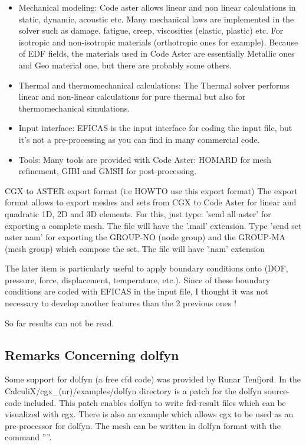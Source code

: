 \documentclass{article}
\begin{document}
\begin{appendix}
\begin{itemize}

\item Mechanical modeling: 
Code aster allows linear and non linear calculations in static, dynamic, acoustic etc. Many mechanical laws are implemented in the solver such as damage, fatigue, creep, viscosities (elastic, plastic) etc. For isotropic and non-isotropic materials (orthotropic ones for example).
Because of EDF fields, the materials used in Code Aster are essentially Metallic ones and Geo material one, but there are probably some others.

\item Thermal and thermomechanical calculations: 
The Thermal solver performs linear and non-linear calculations for pure thermal but also for thermomechanical simulations.

\item Input interface: 
EFICAS is the input interface for coding the input file, but it's not a pre-processing as you can find in many commercial code.

\item Tools: 
Many tools are provided with Code Aster: HOMARD for mesh refinement, GIBI and GMSH for post-processing.
\end{itemize}

CGX to ASTER export format (i.e HOWTO use this export format)
The export format allows to export meshes and sets from CGX to Code Aster for linear and quadratic 1D, 2D and 3D elements. For this, just type: 'send all aster' for exporting a complete mesh. The file will have the '.mail' extension.
Type 'send set aster nam' for exporting the GROUP-NO (node group) and the GROUP-MA (mesh group) which compose the set. The file will have '.nam' extension

The later item is particularly useful to apply boundary conditions onto (DOF, pressure, force, displacement, temperature, etc.). Since of these boundary conditions are coded with EFICAS in the input file, I thought it was not necessary to develop another features than the 2 previous ones !

So far results can not be read.

\subsection{\label{Remarks Concerning dolfyn}Remarks Concerning dolfyn}
Some support for dolfyn (a free cfd code) was provided by Runar Tenfjord.
In the CalculiX/cgx\_(nr)/examples/dolfyn directory is a patch for the dolfyn source-code included. This patch enables dolfyn to write frd-result files which can be visualized with cgx. There is also an example which allows cgx to be used as an pre-processor for dolfyn. The mesh can be written in dolfyn format with the command ''''.  


\end{appendix}
\end{document}
